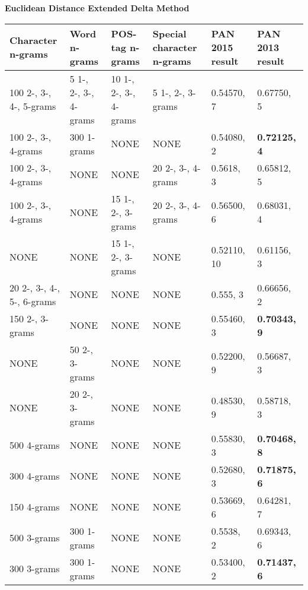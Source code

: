 \begin{landscape}
\begin{table}
    \centering
    \textbf{Euclidean Distance Extended Delta Method}\par\medskip
    \small
    \begin{tabular}{llll|ll}
        \textbf{Character n-grams} & \textbf{Word n-grams} &
        \textbf{POS-tag n-grams} & \textbf{Special character n-grams} &
        \textbf{PAN 2015 result} & \textbf{PAN 2013 result} \\
        \hline
        100 2-, 3-, 4-, 5-grams & 5 1-, 2-, 3-, 4-grams &
        10 1-, 2-, 3-, 4-grams & 5 1-, 2-, 3-grams & 0.54570, 7 & 0.67750, 5 \\
        100 2-, 3-, 4-grams & 300 1-grams & NONE & NONE & 0.54080, 2 &
        \textbf{0.72125, 4} \\
        100 2-, 3-, 4-grams & NONE & NONE & 20 2-, 3-, 4-grams &
        0.5618, 3 & 0.65812, 5 \\
        100 2-, 3-, 4-grams & NONE & 15 1-, 2-, 3-grams & 20 2-, 3-, 4-grams &
        0.56500, 6 & 0.68031, 4 \\
        NONE & NONE & 15 1-, 2-, 3-grams & NONE & 0.52110, 10 & 0.61156, 3 \\
        20 2-, 3-, 4-, 5-, 6-grams & NONE & NONE & NONE & 0.555, 3 &
        0.66656, 2 \\
        150 2-, 3-grams & NONE & NONE & NONE & 0.55460, 3 &
        \textbf{0.70343, 9} \\
        NONE & 50 2-, 3-grams & NONE & NONE & 0.52200, 9 & 0.56687, 3 \\
        NONE & 20 2-, 3-grams & NONE & NONE & 0.48530, 9 & 0.58718, 3 \\
        500 4-grams & NONE & NONE & NONE & 0.55830, 3 & \textbf{0.70468, 8} \\
        300 4-grams & NONE & NONE & NONE & 0.52680, 3 & \textbf{0.71875, 6} \\
        150 4-grams & NONE & NONE & NONE & 0.53669, 6 & 0.64281, 7 \\
        500 3-grams & 300 1-grams & NONE & NONE & 0.5538, 2 & 0.69343, 6 \\
        300 3-grams & 300 1-grams & NONE & NONE & 0.53400, 2 &
        \textbf{0.71437, 6} \\

\end{tabular}
\end{table}
\end{landscape}
